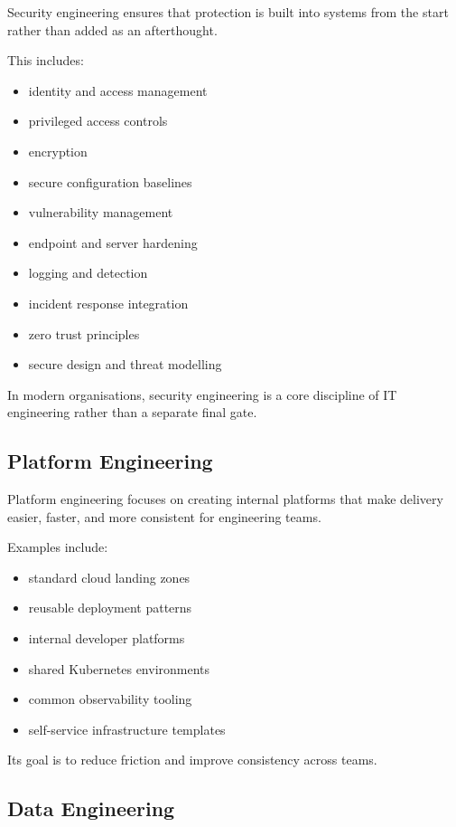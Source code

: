 \documentclass[
  british,
  letterpaper,
  DIV=11,
  numbers=noendperiod]{scrartcl}
\providecommand{\tightlist}{%
  \setlength{\itemsep}{0pt}\setlength{\parskip}{0pt}}
\begin{document}
Security engineering ensures that protection is built into systems from
the start rather than added as an afterthought.

This includes:

\begin{itemize}
\tightlist
\item
  identity and access management
\item
  privileged access controls
\item
  encryption
\item
  secure configuration baselines
\item
  vulnerability management
\item
  endpoint and server hardening
\item
  logging and detection
\item
  incident response integration
\item
  zero trust principles
\item
  secure design and threat modelling
\end{itemize}

In modern organisations, security engineering is a core discipline of IT
engineering rather than a separate final gate.

\subsection{Platform Engineering}\label{platform-engineering}

Platform engineering focuses on creating internal platforms that make
delivery easier, faster, and more consistent for engineering teams.

Examples include:

\begin{itemize}
\tightlist
\item
  standard cloud landing zones
\item
  reusable deployment patterns
\item
  internal developer platforms
\item
  shared Kubernetes environments
\item
  common observability tooling
\item
  self-service infrastructure templates
\end{itemize}

Its goal is to reduce friction and improve consistency across teams.

\subsection{Data Engineering}\label{data-engineering}
\end{document}
